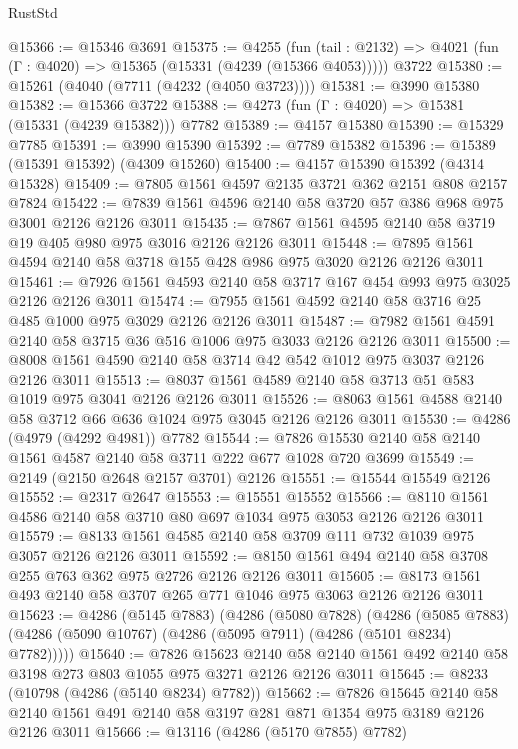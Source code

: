 \begin{lexlean}{RustStd}
\begin{coremodule}
@15366 := @15346 @3691
@15375 := @4255
    (fun (tail : @2132) => @4021 (fun (Γ : @4020) => @15365 (@15331 (@4239 (@15366 @4053)))))
    @3722
@15380 := @15261 (@4040 (@7711 (@4232 (@4050 @3723))))
@15381 := @3990 @15380
@15382 := @15366 @3722
@15388 := @4273 (fun (Γ : @4020) => @15381 (@15331 (@4239 @15382))) @7782
@15389 := @4157 @15380
@15390 := @15329 @7785
@15391 := @3990 @15390
@15392 := @7789 @15382
@15396 := @15389 (@15391 @15392) (@4309 @15260)
@15400 := @4157 @15390 @15392 (@4314 @15328)
@15409 := @7805 @1561 @4597 @2135 @3721 @362 @2151 @808 @2157 @7824
@15422 := @7839 @1561 @4596 @2140 @58 @3720 @57 @386 @968 @975 @3001 @2126 @2126 @3011
@15435 := @7867 @1561 @4595 @2140 @58 @3719 @19 @405 @980 @975 @3016 @2126 @2126 @3011
@15448 := @7895 @1561 @4594 @2140 @58 @3718 @155 @428 @986 @975 @3020 @2126 @2126 @3011
@15461 := @7926 @1561 @4593 @2140 @58 @3717 @167 @454 @993 @975 @3025 @2126 @2126 @3011
@15474 := @7955 @1561 @4592 @2140 @58 @3716 @25 @485 @1000 @975 @3029 @2126 @2126 @3011
@15487 := @7982 @1561 @4591 @2140 @58 @3715 @36 @516 @1006 @975 @3033 @2126 @2126 @3011
@15500 := @8008 @1561 @4590 @2140 @58 @3714 @42 @542 @1012 @975 @3037 @2126 @2126 @3011
@15513 := @8037 @1561 @4589 @2140 @58 @3713 @51 @583 @1019 @975 @3041 @2126 @2126 @3011
@15526 := @8063 @1561 @4588 @2140 @58 @3712 @66 @636 @1024 @975 @3045 @2126 @2126 @3011
@15530 := @4286 (@4979 (@4292 @4981)) @7782
@15544 := @7826 @15530 @2140 @58 @2140 @1561 @4587 @2140 @58 @3711 @222 @677 @1028 @720 @3699
@15549 := @2149 (@2150 @2648 @2157 @3701) @2126
@15551 := @15544 @15549 @2126
@15552 := @2317 @2647
@15553 := @15551 @15552
@15566 := @8110 @1561 @4586 @2140 @58 @3710 @80 @697 @1034 @975 @3053 @2126 @2126 @3011
@15579 := @8133 @1561 @4585 @2140 @58 @3709 @111 @732 @1039 @975 @3057 @2126 @2126 @3011
@15592 := @8150 @1561 @494 @2140 @58 @3708 @255 @763 @362 @975 @2726 @2126 @2126 @3011
@15605 := @8173 @1561 @493 @2140 @58 @3707 @265 @771 @1046 @975 @3063 @2126 @2126 @3011
@15623 := @4286
    (@5145 @7883)
    (@4286
      (@5080 @7828)
      (@4286
        (@5085 @7883)
        (@4286 (@5090 @10767) (@4286 (@5095 @7911) (@4286 (@5101 @8234) @7782)))))
@15640 := @7826
    @15623
    @2140
    @58
    @2140
    @1561
    @492
    @2140
    @58
    @3198
    @273
    @803
    @1055
    @975
    @3271
    @2126
    @2126
    @3011
@15645 := @8233 (@10798 (@4286 (@5140 @8234) @7782))
@15662 := @7826
    @15645
    @2140
    @58
    @2140
    @1561
    @491
    @2140
    @58
    @3197
    @281
    @871
    @1354
    @975
    @3189
    @2126
    @2126
    @3011
@15666 := @13116 (@4286 (@5170 @7855) @7782)

\end{coremodule}
\end{lexlean}

